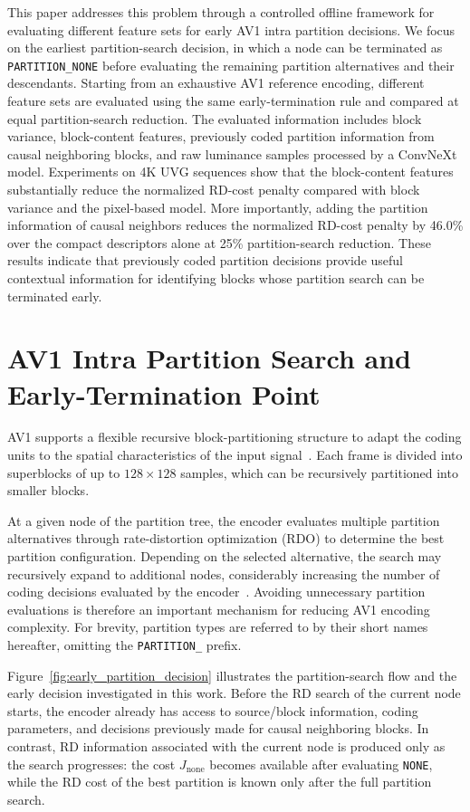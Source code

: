 \documentclass{article}
\begin{document}
This paper addresses this problem through a controlled offline framework for evaluating different feature sets for early AV1 intra partition decisions. We focus on the earliest partition-search decision, in which a node can be terminated as \texttt{PARTITION\_NONE} before evaluating the remaining partition alternatives and their descendants. Starting from an exhaustive AV1 reference encoding, different feature sets are evaluated using the same early-termination rule and compared at equal partition-search reduction. The evaluated information includes block variance, block-content features, previously coded partition information from causal neighboring blocks, and raw luminance samples processed by a ConvNeXt model. Experiments on 4K UVG sequences show that the block-content features substantially reduce the normalized RD-cost penalty compared with block variance and the pixel-based model. More importantly, adding the partition information of causal neighbors reduces the normalized RD-cost penalty by 46.0\% over the compact descriptors alone at 25\% partition-search reduction. These results indicate that previously coded partition decisions provide useful contextual information for identifying blocks whose partition search can be terminated early.

\section{AV1 Intra Partition Search and Early-Termination Point}

AV1 supports a flexible recursive block-partitioning structure to adapt the coding units to the spatial characteristics of the input signal~\cite{han2021av1overview,chen2018av1tools}. Each frame is divided into superblocks of up to $128\times128$ samples, which can be recursively partitioned into smaller blocks.

At a given node of the partition tree, the encoder evaluates multiple partition alternatives through rate-distortion optimization (RDO) to determine the best partition configuration. Depending on the selected alternative, the search may recursively expand to additional nodes, considerably increasing the number of coding decisions evaluated by the encoder~\cite{bender2023av1complexity}. Avoiding unnecessary partition evaluations is therefore an important mechanism for reducing AV1 encoding complexity. For brevity, partition types are referred to by their short names hereafter, omitting the \texttt{PARTITION\_} prefix.

Figure~\ref{fig:early_partition_decision} illustrates the partition-search flow and the early decision investigated in this work. Before the RD search of the current node starts, the encoder already has access to source/block information, coding parameters, and decisions previously made for causal neighboring blocks. In contrast, RD information associated with the current node is produced only as the search progresses: the cost $J_{\mathrm{none}}$ becomes available after evaluating \texttt{NONE}, while the RD cost of the best partition is known only after the full partition search.
\end{document}
